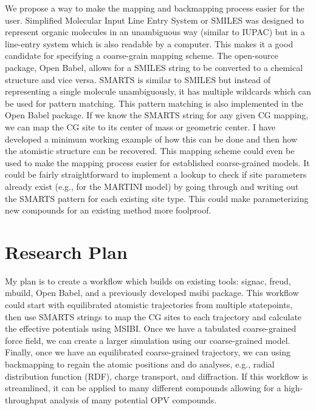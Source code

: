 We propose a way to make the mapping and backmapping process easier for the user.
Simplified Molecular Input Line Entry System or SMILES was designed to represent organic molecules in an unambiguous way (similar to IUPAC) but in a line-entry system which is also readable by a computer\cite{Weininger1988}.
This makes it a good candidate for specifying a coarse-grain mapping scheme.
The open-source package, Open Babel, allows for a SMILES string to be converted to a chemical structure and vice versa\cite{openbabel, OBoyle2011}.
SMARTS is similar to SMILES but instead of representing a single molecule unambiguously, it has multiple wildcards which can be used for pattern matching\cite{daylight}.
This pattern matching is also implemented in the Open Babel package.
If we know the SMARTS string for any given CG mapping, we can map the CG site to its center of mass or geometric center.
I have developed a minimum working example of how this can be done and then how the atomistic structure can be recovered\cite{grits}.
This mapping scheme could even be used to make the mapping process easier for established coarse-grained models.
It could be fairly straightforward to implement a lookup to check if site parameters already exist (e.g., for the MARTINI model) by going through and writing out the SMARTS pattern for each existing site type.
This could make parameterizing new compounds for an existing method more foolproof.

\section*{Research Plan}

My plan is to create a workflow which builds on existing tools: signac, freud, mbuild, Open Babel, and a previously developed msibi package.
This workflow could start with equilibrated atomistic trajectories from multiple statepoints, then use SMARTS strings to map the CG sites to each trajectory and calculate the effective potentials using MSIBI\@.
Once we have a tabulated coarse-grained force field, we can create a larger simulation using our coarse-grained model.
Finally, once we have an equilibrated coarse-grained trajectory, we can using backmapping to regain the atomic positions and do analyses, e.g., radial distribution function (RDF), charge transport, and diffraction.
If this workflow is streamlined, it can be applied to many different compounds allowing for a high-throughput analysis of many potential OPV compounds.


